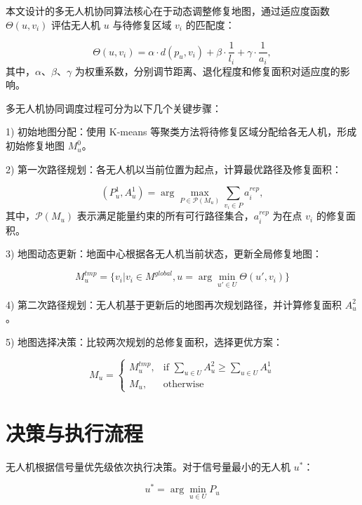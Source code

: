 \documentclass[AutoFakeBold]{LZUThesis}
\begin{document}
本文设计的多无人机协同算法核心在于动态调整修复地图，通过适应度函数 $\Theta(u,v_i)$ 评估无人机 $u$ 与待修复区域 $v_i$ 的匹配度：

\begin{equation}
	\Theta(u,v_i) = \alpha \cdot d(p_u, v_i) + \beta \cdot \frac{1}{l_i} + \gamma \cdot \frac{1}{a_i},
\end{equation}
其中，$\alpha$、$\beta$、$\gamma$ 为权重系数，分别调节距离、退化程度和修复面积对适应度的影响。

多无人机协同调度过程可分为以下几个关键步骤：

		1) 初始地图分配：使用 K-means 等聚类方法将待修复区域分配给各无人机，形成初始修复地图 $M_u^0$。

		2) 第一次路径规划：各无人机以当前位置为起点，计算最优路径及修复面积：

		\begin{equation}
			(P_u^1, A_u^1) = \arg\max_{P \in \mathcal{P}(M_u)} \sum_{v_i \in P} a_i^{rep},
		\end{equation}
		其中，$\mathcal{P}(M_u)$ 表示满足能量约束的所有可行路径集合，$a_i^{rep}$ 为在点 $v_i$ 的修复面积。

		3) 地图动态更新：地面中心根据各无人机当前状态，更新全局修复地图：

		\begin{equation}
			M_u^{tmp} = \{v_i | v_i \in M^{global}, u = \arg\min_{u' \in U} \Theta(u',v_i)\}
		\end{equation}

		4) 第二次路径规划：无人机基于更新后的地图再次规划路径，并计算修复面积 $A_u^2$。

		5) 地图选择决策：比较两次规划的总修复面积，选择更优方案：

\begin{equation}
	M_u =
	\begin{cases}
		M_u^{tmp}, & \text{if } \sum_{u \in U} A_u^2 \geq \sum_{u \in U} A_u^1 \\
		M_u, & \text{otherwise}
	\end{cases}
\end{equation}

\section{决策与执行流程}

无人机根据信号量优先级依次执行决策。对于信号量最小的无人机 $u^*$：

\begin{equation}
	u^* = \arg\min_{u \in U} P_u
\end{equation}
\end{document}
